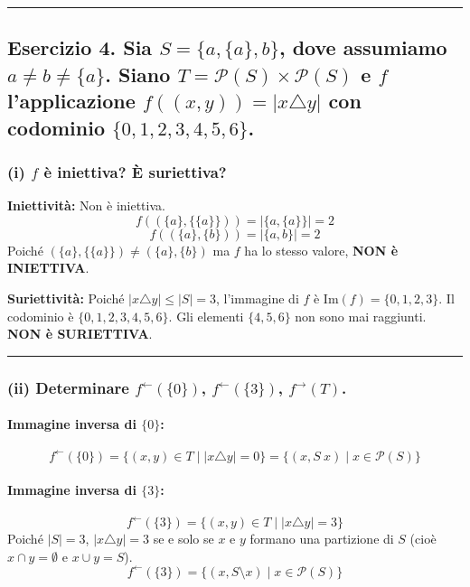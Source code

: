 \vspace{0.5cm}
\hrule
\vspace{0.5cm}

\subsection*{Esercizio 4. Sia $S = \{a, \{a\}, b\}$, dove assumiamo $a \neq b \neq \{a\}$. Siano $T = \mathcal{P}(S) \times \mathcal{P}(S)$ e $f$ l'applicazione $f((x, y)) = |x \triangle y|$ con codominio $\{0, 1, 2, 3, 4, 5, 6\}$.}

\subsubsection*{(i) $f$ è iniettiva? È suriettiva?}

\textbf{Iniettività:}
Non è iniettiva. 
$$ f((\{a\}, \{\{a\}\})) = |\{a, \{a\}\}| = 2 $$
$$ f((\{a\}, \{b\})) = |\{a, b\}| = 2 $$
Poiché $(\{a\}, \{\{a\}\}) \ne (\{a\}, \{b\})$ ma $f$ ha lo stesso valore, \textbf{NON è INIETTIVA}.

\textbf{Suriettività:}
Poiché $|x \triangle y| \le |S| = 3$, l'immagine di $f$ è $\text{Im}(f) = \{0, 1, 2, 3\}$.
Il codominio è $\{0, 1, 2, 3, 4, 5, 6\}$. Gli elementi $\{4, 5, 6\}$ non sono mai raggiunti.
\textbf{NON è SURIETTIVA}.

\vspace{0.3cm}
\hrule
\vspace{0.3cm}

\subsubsection*{(ii) Determinare $f^{\leftarrow}(\{0\})$, $f^{\leftarrow}(\{3\})$, $f^{\rightarrow}(T)$.}

\paragraph*{Immagine inversa di $\{0\}$:}
$$ f^{\leftarrow}(\{0\}) = \{(x, y) \in T \mid |x \triangle y| = 0\} = \{(x, S \ x) \mid x \in \mathcal{P}(S)\} $$

\paragraph*{Immagine inversa di $\{3\}$:}
$$ f^{\leftarrow}(\{3\}) = \{(x, y) \in T \mid |x \triangle y| = 3\} $$
Poiché $|S|=3$, $|x \triangle y| = 3$ se e solo se $x$ e $y$ formano una partizione di $S$ (cioè $x \cap y = \emptyset$ e $x \cup y = S$).
$$ f^{\leftarrow}(\{3\}) = \{(x, S \setminus x) \mid x \in \mathcal{P}(S)\} $$

